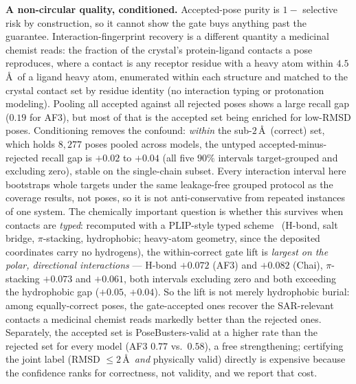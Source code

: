 \documentclass[10pt]{article}
\begin{document}
\textbf{A non-circular quality, conditioned.} Accepted-pose purity is $1-$ selective risk by
construction, so it cannot show the gate buys anything past the guarantee. Interaction-fingerprint recovery
is a different quantity a medicinal chemist reads: the fraction of the crystal's protein-ligand contacts a
pose reproduces, where a contact is any receptor residue with a heavy atom within $4.5$\,\AA\ of a ligand
heavy atom, enumerated within each structure and matched to the crystal contact set by residue identity
(no interaction typing or protonation modeling). Pooling all accepted against all rejected poses shows a
large recall gap ($0.19$ for AF3), but most of that is the accepted set being enriched for low-RMSD poses.
Conditioning removes the confound: \emph{within} the sub-$2$\,\AA\ (correct) set, which holds $8{,}277$ poses
pooled across models, the untyped accepted-minus-rejected recall gap is $+0.02$ to $+0.04$ (all five $90\%$
intervals target-grouped and excluding zero), stable on the single-chain subset. Every interaction interval
here bootstraps whole targets under the same leakage-free grouped protocol as the coverage results, not
poses, so it is not anti-conservative from repeated instances of one system. The chemically important question is whether
this survives when contacts are \emph{typed}: recomputed with a PLIP-style typed scheme~\citep{plip} (H-bond, salt
bridge, $\pi$-stacking, hydrophobic; heavy-atom geometry, since the deposited coordinates carry no
hydrogens), the within-correct gate lift is \emph{largest on the polar, directional interactions} --- H-bond
$+0.072$ (AF3) and $+0.082$ (Chai), $\pi$-stacking $+0.073$ and $+0.061$, both intervals excluding zero and
both exceeding the hydrophobic gap ($+0.05$, $+0.04$). So the lift is not merely hydrophobic burial: among
equally-correct poses, the gate-accepted ones recover the SAR-relevant contacts a medicinal chemist reads
markedly better than the rejected ones. Separately, the accepted set is
PoseBusters-valid at a higher rate than the rejected set for every model (AF3 $0.77$ vs.\ $0.58$), a free
strengthening; certifying the joint label (RMSD $\le2$\,\AA\ \emph{and} physically valid) directly is
expensive because the confidence ranks for correctness, not validity, and we report that cost.
\end{document}
